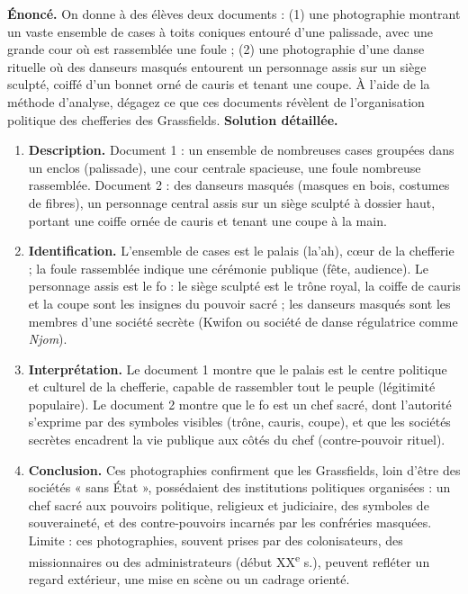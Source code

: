 \documentclass[11pt]{article}
\begin{document}
\begin{exoresolu}
\textbf{Énoncé.} On donne à des élèves deux documents : (1) une photographie montrant un vaste ensemble de cases à toits coniques entouré d'une palissade, avec une grande cour où est rassemblée une foule ; (2) une photographie d'une danse rituelle où des danseurs masqués entourent un personnage assis sur un siège sculpté, coiffé d'un bonnet orné de cauris et tenant une coupe. À l'aide de la méthode d'analyse, dégagez ce que ces documents révèlent de l'organisation politique des chefferies des Grassfields.
\tcblower
\textbf{Solution détaillée.}
\begin{enumerate}
\item \textbf{Description.} Document 1 : un ensemble de nombreuses cases groupées dans un enclos (palissade), une cour centrale spacieuse, une foule nombreuse rassemblée. Document 2 : des danseurs masqués (masques en bois, costumes de fibres), un personnage central assis sur un siège sculpté à dossier haut, portant une coiffe ornée de cauris et tenant une coupe à la main.
\item \textbf{Identification.} L'ensemble de cases est le palais (la'ah), cœur de la chefferie ; la foule rassemblée indique une cérémonie publique (fête, audience). Le personnage assis est le fo : le siège sculpté est le trône royal, la coiffe de cauris et la coupe sont les insignes du pouvoir sacré ; les danseurs masqués sont les membres d'une société secrète (Kwifon ou société de danse régulatrice comme \emph{Njom}).
\item \textbf{Interprétation.} Le document 1 montre que le palais est le centre politique et culturel de la chefferie, capable de rassembler tout le peuple (légitimité populaire). Le document 2 montre que le fo est un chef sacré, dont l'autorité s'exprime par des symboles visibles (trône, cauris, coupe), et que les sociétés secrètes encadrent la vie publique aux côtés du chef (contre-pouvoir rituel).
\item \textbf{Conclusion.} Ces photographies confirment que les Grassfields, loin d'être des sociétés « sans État », possédaient des institutions politiques organisées : un chef sacré aux pouvoirs politique, religieux et judiciaire, des symboles de souveraineté, et des contre-pouvoirs incarnés par les confréries masquées. Limite : ces photographies, souvent prises par des colonisateurs, des missionnaires ou des administrateurs (début XX\textsuperscript{e} s.), peuvent refléter un regard extérieur, une mise en scène ou un cadrage orienté.
\end{enumerate}
\end{exoresolu}
\end{document}
